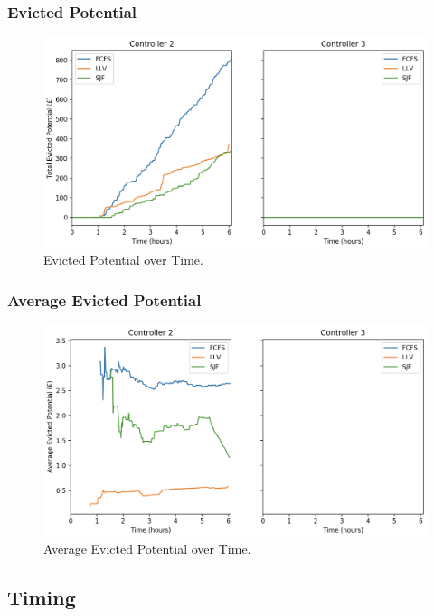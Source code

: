 \documentclass[a4paper,11pt,titlepage]{report}
\begin{document}
\subsubsection{Evicted Potential}
\begin{figure}[!hbpt]
  \center
  \includegraphics[width=\linewidth]{img/small/potential.png}
  \caption{Evicted Potential over Time.}
  \label{fig:small_potential}
\end{figure}

\subsubsection{Average Evicted Potential}
\begin{figure}[!hbpt]
  \center
  \includegraphics[width=\linewidth]{img/small/avgpotential.png}
  \caption{Average Evicted Potential over Time.}
  \label{fig:small_avgpotential}
\end{figure}

\clearpage
\subsection{Timing}
\end{document}
